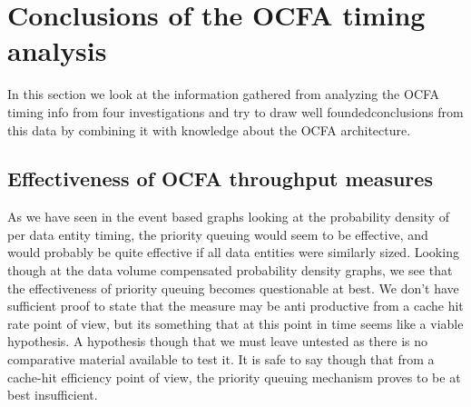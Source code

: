 \section{Conclusions of the OCFA timing analysis}
In this section we look at the information gathered from analyzing the OCFA timing info from four investigations and try to draw well foundedconclusions from this data by combining it with knowledge about the OCFA architecture.
\subsection{Effectiveness of OCFA throughput measures}
As we have seen in the event based graphs looking at the probability density of per data entity timing, the priority queuing would seem to be effective, and would probably be quite effective if all data entities were similarly sized. Looking though at the data volume compensated probability density graphs, we see that the effectiveness of priority queuing becomes questionable at best. We don't have sufficient proof to state that the measure may be anti productive from a cache hit rate point of view, but its something that at this point in time seems like a viable hypothesis. A hypothesis though that we must leave untested as there is no comparative material available to test it. It is safe to say though that from a cache-hit efficiency point of view, the priority queuing mechanism proves to be at best insufficient.

